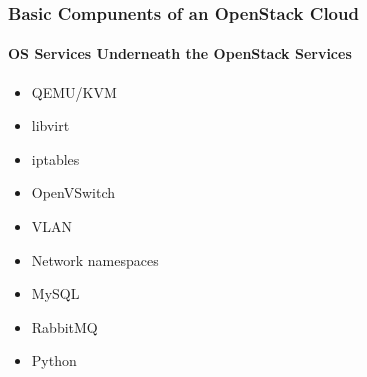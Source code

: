 \documentclass[helvetica,english,utf8,notitle,nologo]{beamer}
\begin{document}
\begin{frame}
  \frametitle{Basic Compunents of an OpenStack Cloud}
  \framesubtitle{OS Services Underneath the OpenStack Services}
  \begin{itemize}
  \item QEMU/KVM
  \item libvirt
  \item iptables
  \item OpenVSwitch
  \item VLAN
  \item Network namespaces
  \item MySQL
  \item RabbitMQ
  \item Python
  \end{itemize}
\end{frame}
\end{document}
